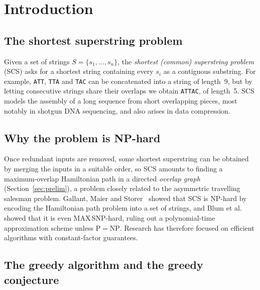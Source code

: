 \documentclass[11pt,a4paper]{article}   %
\theoremstyle{compact}
\theoremstyle{compactdef}
\newcommand{\str}[1]{\texttt{#1}}           %
\newif\ifdraft \draftfalse
\begin{document}
\setcounter{page}{1}
\setcounter{tocdepth}{2}
\tableofcontents

\ifdraft
\vfill\noindent{\color{gray}\small Draft check: the main body
currently ends on page \pageref{endofbody} (limit: 10).}
\fi

\clearpage
{}
\setcounter{page}{1}


\section{Introduction}\label{sec:intro}

\subsection{The shortest superstring problem}

Given a set of strings $S=\{s_1,\dots,s_n\}$, the \emph{shortest (common)
superstring problem} (SCS) asks for a shortest string containing every
$s_i$ as a contiguous substring. For example, \str{ATT}, \str{TTA} and
\str{TAC} can be concatenated into a string of length~9, but by letting
consecutive strings share their overlaps we obtain \str{ATTAC}, of
length~5. SCS models the assembly of a long sequence from short
overlapping pieces, most notably in shotgun DNA sequencing, and also
arises in data compression.

\subsection{Why the problem is NP-hard}

Once redundant inputs are removed, some shortest superstring can be
obtained by merging the inputs in a suitable order, so SCS amounts to finding a
maximum-overlap Hamiltonian path in a directed \emph{overlap graph}
(Section~\ref{sec:prelim}), a problem closely related to the asymmetric
travelling salesman problem. Gallant, Maier and Storer~\cite{GMS80}
showed that SCS is NP-hard by encoding the Hamiltonian path problem into a
set of strings, and Blum et al.~\cite{BJLTY94} showed that it is even
MAX\,SNP-hard, ruling out a polynomial-time approximation scheme unless
$\mathrm{P}=\mathrm{NP}$. Research has therefore focused on efficient
algorithms with constant-factor guarantees.

\subsection{The greedy algorithm and the greedy conjecture}
\end{document}
